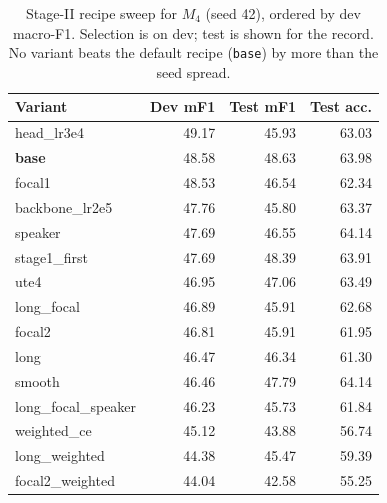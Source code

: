 \begin{table}[t]
\centering
\caption{Stage-II recipe sweep for $M_4$ (seed 42), ordered by dev macro-F1. Selection is on dev; test is shown for the record. No variant beats the default recipe (\texttt{base}) by more than the seed spread.}
\label{tab:sweep}
\small
\begin{tabular}{lrrr}
\toprule
Variant & Dev mF1 & Test mF1 & Test acc. \\
\midrule
head\_lr3e4 & 49.17 & 45.93 & 63.03 \\
\textbf{base} & 48.58 & 48.63 & 63.98 \\
focal1 & 48.53 & 46.54 & 62.34 \\
backbone\_lr2e5 & 47.76 & 45.80 & 63.37 \\
speaker & 47.69 & 46.55 & 64.14 \\
stage1\_first & 47.69 & 48.39 & 63.91 \\
ute4 & 46.95 & 47.06 & 63.49 \\
long\_focal & 46.89 & 45.91 & 62.68 \\
focal2 & 46.81 & 45.91 & 61.95 \\
long & 46.47 & 46.34 & 61.30 \\
smooth & 46.46 & 47.79 & 64.14 \\
long\_focal\_speaker & 46.23 & 45.73 & 61.84 \\
weighted\_ce & 45.12 & 43.88 & 56.74 \\
long\_weighted & 44.38 & 45.47 & 59.39 \\
focal2\_weighted & 44.04 & 42.58 & 55.25 \\
\bottomrule
\end{tabular}
\end{table}

